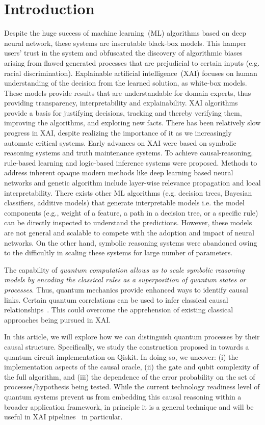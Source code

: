 \documentclass[%
 aps,
 jmp,%
 amsmath,amssymb,
 reprint,%
]{revtex4-2}
\begin{document}
\section{\label{s1}Introduction}


Despite the huge success of machine learning~(ML) algorithms based on deep neural network, these systems are inscrutable black-box models.
This hamper users' trust in the system and obfuscated the discovery of algorithmic biases arising from flawed generated processes that are prejudicial to certain inputs (e.g. racial discrimination).
Explainable artificial intelligence~(XAI) focuses on human understanding of the decision from the learned solution, as white-box models.
These models provide results that are understandable for domain experts, thus providing transparency, interpretability and explainability.
XAI algorithms provide a basis for justifying decisions, tracking and thereby verifying them, improving the algorithms, and exploring new facts.
There has been relatively slow progress in XAI, despite realizing the importance of it as we increasingly automate critical systems.
Early advances on XAI were based on symbolic reasoning systems and truth maintenance systems.
To achieve causal-reasoning, rule-based learning and logic-based inference systems were proposed.
Methods to address inherent opaque modern methods like deep learning based neural networks and genetic algorithm include layer-wise relevance propagation and local interpretability.
There exists other ML algorithms (e.g. decision trees, Bayesian classifiers, additive models) that generate interpretable models i.e. the model components (e.g., weight of a feature, a path in a decision tree, or a specific rule) can be directly inspected to understand the predictions.
However, these models are not general and scalable to compete with the adoption and impact of neural networks.
On the other hand, symbolic reasoning systems were abandoned owing to the difficultly in scaling these systems for large number of parameters.

The capability of \textit{quantum computation allows us to scale symbolic reasoning models by encoding the classical rules as a superposition of quantum states or processes}.
Thus, quantum mechanics provide enhanced ways to identify causal links.
Certain quantum correlations can be used to infer classical causal relationships~\cite{ried2015quantum,fitzsimons2015quantum}.
This could overcome the apprehension of existing classical approaches being pursued in XAI.

In this article, we will explore how we can distinguish quantum processes by their causal structure.
Specifically, we study the construction proposed in \cite{chiribella2019quantum} towards a quantum circuit implementation on Qiskit.
In doing so, we uncover: (i) the implementation aspects of the causal oracle, (ii) the gate and qubit complexity of the full algorithm, and (iii) the dependence of the error probability on the set of processes/hypothesis being tested.
While the current technology readiness level of quantum systems prevent us from embedding this causal reasoning within a broader application framework, in principle it is a general technique and will be useful in XAI pipelines~\cite{lavin2021simulation,maruyama2021categorical} in particular.
\end{document}
